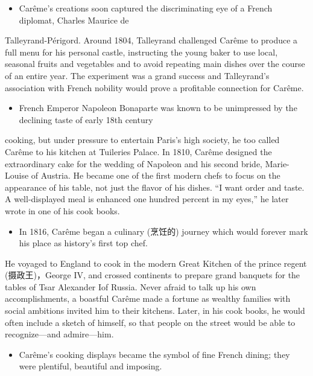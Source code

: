 \documentclass[UTF8,11pt]{ctexart}
\begin{document}
\begin{itemize}[leftmargin=2em,itemsep=.2em,topsep=.4em]\item[F.] Carême's creations soon captured the discriminating eye of a French diplomat, Charles Maurice de
\end{itemize}

Talleyrand-Périgord. Around 1804, Talleyrand challenged Carême to produce a full menu for his personal castle, instructing the young baker to use local, seasonal fruits and vegetables and to avoid repeating main dishes over the course of an entire year. The experiment was a grand success and Talleyrand's association with French nobility would prove a profitable connection for Carême.


\begin{itemize}[leftmargin=2em,itemsep=.2em,topsep=.4em]\item[G.] French Emperor Napoleon Bonaparte was known to be unimpressed by the declining taste of early 18th century
\end{itemize}

cooking, but under pressure to entertain Paris's high society, he too called Carême to his kitchen at Tuileries Palace. In 1810, Carême designed the extraordinary cake for the wedding of Napoleon and his second bride, Marie-Louise of Austria. He became one of the first modern chefs to focus on the appearance of his table, not just the flavor of his dishes. “I want order and taste. A well-displayed meal is enhanced one hundred percent in my eyes,” he later wrote in one of his cook books.


\begin{itemize}[leftmargin=2em,itemsep=.2em,topsep=.4em]\item[H.] In 1816, Carême began a culinary (烹饪的) journey which would forever mark his place as history's first top chef.
\end{itemize}

He voyaged to England to cook in the modern Great Kitchen of the prince regent (摄政王)，George IV, and crossed continents to prepare grand banquets for the tables of Tsar Alexander Iof Russia. Never afraid to talk up his own accomplishments, a boastful Carême made a fortune as wealthy families with social ambitions invited him to their kitchens. Later, in his cook books, he would often include a sketch of himself, so that people on the street would be able to recognize—and admire—him.


\begin{itemize}[leftmargin=2em,itemsep=.2em,topsep=.4em]\item[I.] Carême's cooking displays became the symbol of fine French dining; they were plentiful, beautiful and imposing.
\end{itemize}
\end{document}
